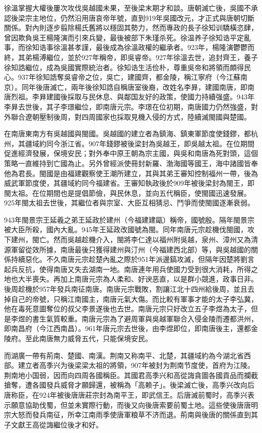 徐溫掌握大權後屢次攻伐吳越國未果，至後梁末期才和談。唐朝滅亡後，吳國不承認後梁宗主地位，仍然沿用唐哀帝年號，直到919年吳國改元，才正式與唐朝切斷關係。對內則逐步翦除楊氏舊將以穩固其勢力，然而專政的長子徐知训驕橫恣肆，曾因欺負吳王楊隆演而引來兵變，最後被部下朱瑾杀死。徐温养子徐知诰平定亂事，而徐知诰事徐溫甚孝謹，最後成為徐溫政權的繼承者。923年，楊隆演鬱鬱而終，其弟楊溥繼位，並於927年稱帝，即吳睿帝。927年徐溫去世，追封齊王，養子徐知誥繼位，成為吳國實際統治者。徐知诰生活俭朴，尊重吳帝和將領而頗得民心。937年徐知誥奪吳睿帝之位，吳亡，建國齊，都金陵，稱江寧府（今江蘇南京）。同年後唐滅亡，兩年後徐知誥自稱唐室後裔，改姓名李昪，建國南唐，即南唐烈祖。李昪建國後採取与民休息、與鄰国友好的政策，使國力持續强盛。943年李昪去世後，其子李璟繼位，即南唐元宗。李璟在位初期，南唐國力仍然強盛，對外聯合遼朝壓制後周，對四周國家也採取見機入侵的方式，陸續滅閩國與楚國。

在南唐東南方有吳越國與閩國。吳越國的建立者為鎮海、鎮東軍節度使錢鏐，都杭州，其疆域約同今浙江省。907年錢鏐被後梁封為吳越王，即吳越太祖。在位期間促進經濟發展，保境安民；對外奉中原王朝為宗主國，與吳和南唐為死對頭，這個策略一直維持到亡國為止。另外曾經派使冊封新羅、渤海國等國王，海中諸國皆奉他為君長。閩國是由福建觀察使王潮所建立，其與其弟王審知控制福州一帶，後為威武軍節度使，其疆域約同今福建省。王審知執政後於909年被後梁封為閩王，即閩太祖。在位期間也是提倡節儉，與民休息，並向五代稱臣，使閩國迅速發展。925年閩太祖去世後，其繼位者與宗室、大臣互相猜忌、鬥爭而使閩國逐漸衰弱。

943年閩景宗王延羲之弟王延政於建州（今福建建甌）稱帝，國號殷。隔年閩景宗被大臣所殺，國內大亂。945年王延政改國號為閩。同年南唐元宗趁機伐閩國，攻下建州，閩亡。然而吳越趁機介入，閩將李仁達以福州附吳越，泉州、漳州又為清源軍留從效所據，南唐最後只獲得建州與汀州（今福建西北部）等，與吳越國的關係持續惡化。不久南唐元宗趁楚內亂之際於951年派邊鎬攻滅，但隔年因楚將劉言起兵反抗，使得南唐又失去湖南一地。南唐連年用兵使國力受到很大消耗，所得之地也大半喪失。再加上南唐元宗為人柔和、好谀恶直，以是群小競進，政事日非。後周趁機於957年發兵南征南唐。南唐元宗戰敗，割讓江北十四州給後周，並且去掉自己的帝號，只稱江南國主，南唐元氣大傷。而比較有軍事才能的太子李弘冀，他在毒死意圖奪位的叔父李景遂後也去世。南唐元宗只好改立五子李煜為太子，但是李煜的書生氣質較重。南唐元宗為了避周軍與吳越軍聯合入侵金陵而遷都洪州，即南昌府（今江西南昌）。961年唐元宗去世後，由李煜即位，即南唐後主，還都金陵府。至此南唐無力威脅五代，只能保境安民。

而湖廣一帶有荊南、楚國、南漢。荆南又称南平、北楚，其疆域約為今湖北省西部。建立者高季兴为後梁梁太祖的將領，907年被封为荆南节度使，首府为江陵。荆南地小国弱，因而向四周各國稱臣。其國君高季兴和高從誨貪圖各國貢品而攔截搶奪，遭各國發兵威脅才願歸還，被稱為「高赖子」。後梁滅亡後，高季兴改向后唐称臣，在924年被後唐唐莊宗封為南平王，即武信王。后唐滅前蜀时，高季兴表示願意協助伐蜀，但並未實際行動，而後又向後唐索要前蜀土地。這些使後唐唐明宗大怒而發兵南征，所幸江南雨季使唐軍粮草不济而退。荊南與後唐的關係直到其子文獻王高從誨繼位後才和好。

